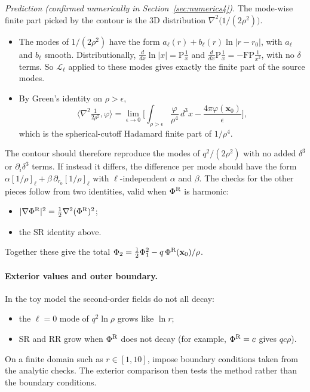 \documentclass[11pt,a4paper]{article}
\newcommand{\Lop}{\mathcal{L}_\ell}
\newcommand{\PhiR}{\Phi^{\rm R}}
\newcommand{\x}{\mathbf{x}}
\begin{document}
\emph{Prediction (confirmed numerically in Section~\ref{sec:numerics4}).} The mode-wise finite part picked by the contour is the 3D distribution $\nabla^2\big(1/(2\rho^2)\big)$.
\begin{itemize}[nosep]
\item The modes of $1/(2\rho^2)$ have the form $a_\ell(r)+b_\ell(r)\ln|r-r_0|$, with $a_\ell$ and $b_\ell$ smooth.
  Distributionally, $\tfrac{d}{dx}\ln|x|=\mathrm P\tfrac1x$ and $\tfrac{d}{dx}\mathrm P\tfrac1x=-\mathrm{FP}\tfrac1{x^2}$, with no $\delta$ terms.
  So $\Lop$ applied to these modes gives exactly the finite part of the source modes.
\item By Green's identity on $\rho>\epsilon$,
  \[
  \big\langle\nabla^2\tfrac1{2\rho^2},\varphi\big\rangle=\lim_{\epsilon\to0}\Big[\int_{\rho>\epsilon}\frac{\varphi}{\rho^4}\,d^3x-\frac{4\pi\varphi(\x_0)}{\epsilon}\Big],
  \]
  which is the spherical-cutoff Hadamard finite part of $1/\rho^4$.
\end{itemize}
The contour should therefore reproduce the modes of $q^2/(2\rho^2)$ with no added $\delta^3$ or $\partial_i\delta^3$ terms.
If instead it differs, the difference per mode should have the form $\alpha[1/\rho]_\ell+\beta\,\partial_{r_0}[1/\rho]_\ell$ with $\ell$-independent $\alpha$ and $\beta$.
The checks for the other pieces follow from two identities, valid when $\PhiR$ is harmonic:
\begin{itemize}[nosep]
\item $|\nabla\PhiR|^2=\tfrac12\nabla^2(\PhiR)^2$;
\item the SR identity above.
\end{itemize}
Together these give the total $\Phi_2=\tfrac12\Phi_1^2-q\,\PhiR(\x_0)/\rho$.

\paragraph{Exterior values and outer boundary.}
In the toy model the second-order fields do not all decay:
\begin{itemize}[nosep]
\item the $\ell=0$ mode of $q^2\ln\rho$ grows like $\ln r$;
\item SR and RR grow when $\PhiR$ does not decay (for example, $\PhiR=c$ gives $qc\rho$).
\end{itemize}
On a finite domain such as $r\in[1,10]$, impose boundary conditions taken from the analytic checks.
The exterior comparison then tests the method rather than the boundary conditions.
\end{document}

